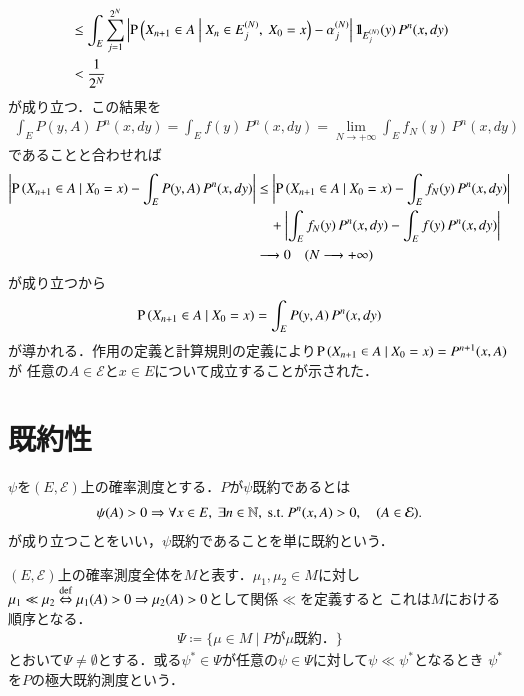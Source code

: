 \begin{prf}
\begin{align}
			&\leq \int_{E} \sum_{j=1}^{2^N} \left| \operatorname{P} \left( X_{n+1} \in A \ \middle|\ X_n \in E^{(N)}_j,\ X_0 = x \right) - \alpha^{(N)}_j \right| \mbox{1}\hspace{-0.25em}\mbox{l}_{E^{(N)}_j}(y)\, P^n(x, dy) \\
			&< \frac{1}{2^N}
		\end{align}
		が成り立つ．この結果を
		\begin{align}
			\int_{E} P(y,A)\, P^n(x,dy) = \int_{E} f(y)\, P^n(x,dy) = \lim_{N \to +\infty} \int_{E} f_N(y)\, P^n(x,dy)
		\end{align}
		であることと合わせれば
		\begin{align}
			\left| \operatorname{P} \left( X_{n+1} \in A \ \middle|\ X_0 = x \right) - \int_{E} P(y,A)\, P^n(x,dy) \right| &\leq \left| \operatorname{P} \left( X_{n+1} \in A \ \middle|\ X_0 = x \right) - \int_{E} f_N(y)\, P^n(x,dy) \right| \\
			&\quad+ \left| \int_{E} f_N(y)\, P^n(x,dy) - \int_{E} f(y)\, P^n(x,dy) \right| \\
			&\longrightarrow 0 \quad (N \longrightarrow +\infty)
		\end{align}
		が成り立つから
		\begin{align}
			\operatorname{P} \left( X_{n+1} \in A \ \middle|\ X_0 = x \right) = \int_{E} P(y,A)\, P^n(x,dy)
		\end{align}
		が導かれる．作用の定義と計算規則の定義により$\operatorname{P} \left( X_{n+1} \in A \ \middle|\ X_0 = x \right) = P^{n+1}(x,A)$が
		任意の$A \in \mathcal{E}$と$x \in E$について成立することが示された．
		\QED
	\end{prf}

\section{既約性}
	\begin{dfn}[既約性]
		$\psi$を$(E,\mathcal{E})$上の確率測度とする．$P$が$\psi$既約であるとは
		\begin{align}
			\psi(A) > 0 \Rightarrow \forall x \in E,\ \exists n \in \mathbb{N},\ \mathrm{s.t.}\ P^n(x,A) > 0, \quad (A \in \mathcal{E}).
		\end{align}
		が成り立つことをいい，$\psi$既約であることを単に既約という．
	\end{dfn}
	
	\begin{dfn}[極大既約測度]
		$(E, \mathcal{E})$上の確率測度全体を$M$と表す．$\mu_1, \mu_2 \in M$に対し
		$\mu_1 \ll \mu_2 \overset{\mathrm{def}}{\Leftrightarrow} \mu_1(A) > 0 \Rightarrow \mu_2(A) > 0$として関係$\ll$を定義すると
		これは$M$における順序となる．
		\begin{align}
			\Psi \coloneqq \{ \mu \in M\ |\ \mbox{$P$が$\mu$既約．} \}
		\end{align}
		とおいて$\Psi \neq \emptyset$とする．或る$\psi^* \in \Psi$が任意の$\psi \in \Psi$に対して$\psi \ll \psi^*$となるとき
		$\psi^*$を$P$の極大既約測度という．
	\end{dfn}
	
